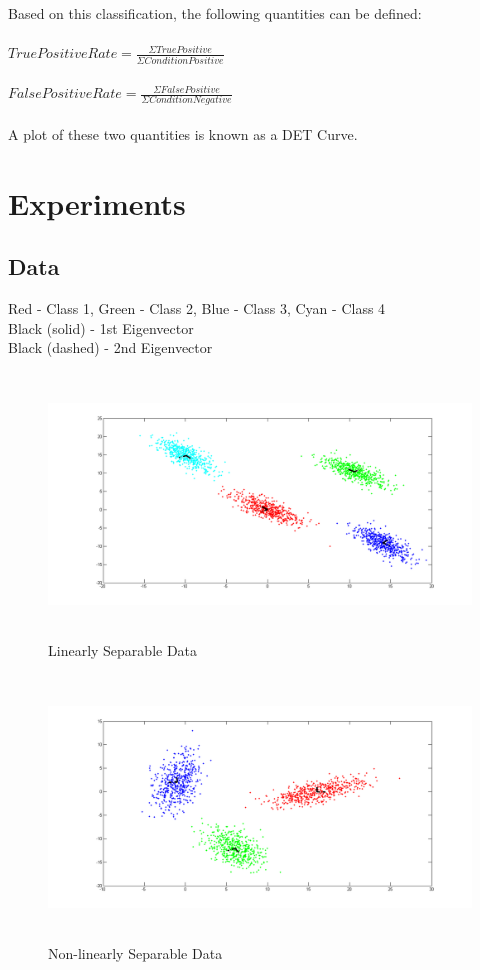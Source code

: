 \documentclass[11pt,a4paper]{article}
\begin{document}
Based on this classification, the following quantities can be defined:\\ \\
$True Positive Rate = \frac{\Sigma True Positive}{\Sigma Condition Positive}$ \\ \\ 
$False Positive Rate = \frac{\Sigma False Positive}{\Sigma Condition Negative}$ \\ \\


A plot of these two quantities is known as a DET Curve. 

\clearpage
\section{Experiments}

\subsection{Data}
Red - Class 1, Green - Class 2, Blue - Class 3, Cyan - Class 4\\
Black (solid) - 1st Eigenvector\\
Black (dashed) - 2nd Eigenvector\\  
\begin{figure}[H]
		\centering
\includegraphics[height=7cm]{Figures/ls_eig.png}
\caption{Linearly Separable Data}
\end{figure}

\begin{figure}[H]
		\centering
\includegraphics[height=7cm]{Figures/NLS_eig.png}
\caption{Non-linearly Separable Data}
\end{figure}
\end{document}
